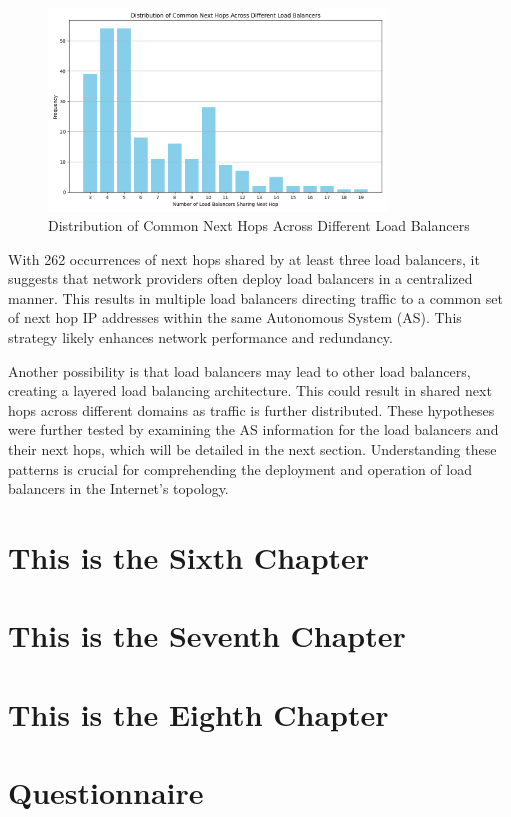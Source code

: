 \documentclass[12pt]{cwru_thesis}
\begin{document}
\begin{figure}[h]
    \centering
    \includegraphics[width=0.8\textwidth]{figures/common_next_hops_distribution.png}
    \caption{Distribution of Common Next Hops Across Different Load Balancers }
    \label{fig:common_next_hops_distribution}
\end{figure}

With 262 occurrences of next hops shared by at least three load balancers, it suggests that network providers often deploy load balancers in a centralized manner. This results in multiple load balancers directing traffic to a common set of next hop IP addresses within the same Autonomous System (AS). This strategy likely enhances network performance and redundancy.

Another possibility is that load balancers may lead to other load balancers, creating a layered load balancing architecture. This could result in shared next hops across different domains as traffic is further distributed. These hypotheses were further tested by examining the AS information for the load balancers and their next hops, which will be detailed in the next section. Understanding these patterns is crucial for comprehending the deployment and operation of load balancers in the Internet's topology.



\chapter{This is the Sixth Chapter}
\chapter{This is the Seventh Chapter}
\chapter{This is the Eighth Chapter}


\appendix

\chapter{Questionnaire}

\printbibliography[heading=bibintoc]
\end{document}
